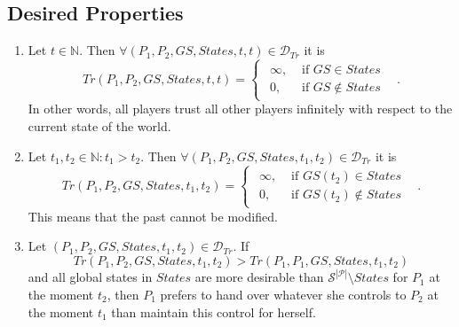 \subsection{Desired Properties}
  \begin{enumerate}
    \item Let $t \in \mathbb{N}$. Then $\forall \left(P_1, P_2, GS, States, t, t\right) \in \mathcal{D}_{Tr}$ it is
    \begin{equation*}
      Tr\left(P_1, P_2, GS, States, t, t\right) =
	\begin{cases}
	\begin{aligned}
	  \infty, & \mbox{ if } GS \in States \\
        0, & \mbox{ if } GS \notin States
	\end{aligned}
	\end{cases} \enspace.
    \end{equation*}
    In other words, all players trust all other players infinitely with respect to the current state of the world.

    \item Let $t_1, t_2 \in \mathbb{N}: t_1 > t_2$. Then $\forall \left(P_1, P_2, GS, States, t_1, t_2\right) \in
    \mathcal{D}_{Tr}$ it is
    \begin{equation*}
      Tr\left(P_1, P_2, GS, States, t_1, t_2\right) =
	\begin{cases}
	\begin{aligned}
	  \infty, & \mbox{ if } GS\left(t_2\right) \in States \\
        0, & \mbox{ if } GS\left(t_2\right) \notin States
	\end{aligned}
	\end{cases} \enspace.
    \end{equation*}
    This means that the past cannot be modified.

    \item Let $\left(P_1, P_2, GS, States, t_1, t_2\right) \in \mathcal{D}_{Tr}$. If 
    \begin{equation*}
      Tr\left(P_1, P_2, GS, States, t_1, t_2\right) > Tr\left(P_1, P_1, GS, States, t_1, t_2\right)
    \end{equation*}
    and all global states in $States$ are more desirable than $\mathcal{S}^{|\mathcal{P}|} \setminus States$ for $P_1$ at
    the moment $t_2$, then $P_1$ prefers to hand over whatever she controls to $P_2$ at the moment $t_1$ than maintain this
    control for herself.


\end{enumerate}

